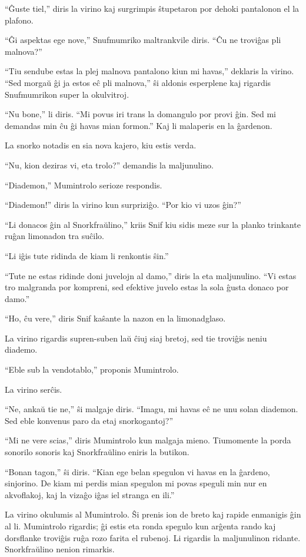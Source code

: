 ``Ĝuste tiel,'' diris la virino kaj surgrimpis ŝtupetaron por dehoki pantalonon el la plafono.

``Ĝi aspektas ege nove,'' Snufmumriko maltrankvile diris. ``Ĉu ne troviĝas pli malnova?''

``Tiu sendube estas la plej malnova pantalono kiun mi havas,'' deklaris la virino. ``Sed morgaŭ ĝi ja estos eĉ pli malnova,'' ŝi aldonis esperplene kaj rigardis Snufmumrikon super la okulvitroj.

``Nu bone,'' li diris. ``Mi povus iri trans la domangulo por provi ĝin. Sed mi demandas min ĉu ĝi havas mian formon.'' Kaj li malaperis en la ĝardenon.

\sectionbreak

La snorko notadis en sia nova kajero, kiu estis verda.

``Nu, kion deziras vi, eta trolo?'' demandis la maljunulino.

``Diademon,'' Mumintrolo serioze respondis.

``Diademon!'' diris la virino kun surpriziĝo. ``Por kio vi uzos ĝin?''

``Li donacos ĝin al Snorkfraŭlino,'' kriis Snif kiu sidis meze sur la planko trinkante ruĝan limonadon tra suĉilo.

``Li iĝis tute ridinda de kiam li renkontis ŝin.''

``Tute ne estas ridinde doni juvelojn al damo,'' diris la eta maljunulino. ``Vi estas tro malgranda por kompreni, sed efektive juvelo estas la sola ĝusta donaco por damo.''

``Ho, ĉu vere,'' diris Snif kaŝante la nazon en la limonadglaso.

La virino rigardis supren-suben laŭ ĉiuj siaj bretoj, sed tie troviĝis neniu diademo.

``Eble sub la vendotablo,'' proponis Mumintrolo.

La virino serĉis.

``Ne, ankaŭ tie ne,'' ŝi malgaje diris. ``Imagu, mi havas eĉ ne unu solan diademon. Sed eble konvenus paro da etaj snorkogantoj?''

``Mi ne vere scias,'' diris Mumintrolo kun malgaja mieno. Tiumomente la porda sonorilo sonoris kaj Snorkfraŭlino eniris la butikon.

``Bonan tagon,'' ŝi diris. ``Kian ege belan spegulon vi havas en la ĝardeno, sinjorino. De kiam mi perdis mian spegulon mi povas speguli min nur en akvoflakoj, kaj la vizaĝo iĝas iel stranga en ili.''

La virino okulumis al Mumintrolo. Ŝi prenis ion de breto kaj rapide enmanigis ĝin al li. Mumintrolo rigardis; ĝi estis eta ronda spegulo kun arĝenta rando kaj dorsflanke troviĝis ruĝa rozo farita el rubenoj. Li rigardis la maljunulinon ridante. Snorkfraŭlino nenion rimarkis.


